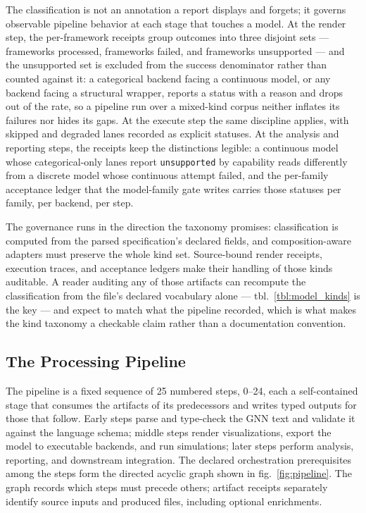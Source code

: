 \documentclass[
  english,
  9pt,
]{extarticle}
\begin{document}
The classification is not an annotation a report displays and forgets;
it governs observable pipeline behavior at each stage that touches a
model. At the render step, the per-framework receipts group outcomes
into three disjoint sets --- frameworks processed, frameworks failed,
and frameworks unsupported --- and the unsupported set is excluded from
the success denominator rather than counted against it: a categorical
backend facing a continuous model, or any backend facing a structural
wrapper, reports a status with a reason and drops out of the rate, so a
pipeline run over a mixed-kind corpus neither inflates its failures nor
hides its gaps. At the execute step the same discipline applies, with
skipped and degraded lanes recorded as explicit statuses. At the
analysis and reporting steps, the receipts keep the distinctions
legible: a continuous model whose categorical-only lanes report
\texttt{unsupported} by capability reads differently from a discrete
model whose continuous attempt failed, and the per-family acceptance
ledger that the model-family gate writes carries those statuses per
family, per backend, per step.

The governance runs in the direction the taxonomy promises:
classification is computed from the parsed specification's declared
fields, and composition-aware adapters must preserve the whole kind set.
Source-bound render receipts, execution traces, and acceptance ledgers
make their handling of those kinds auditable. A reader auditing any of
those artifacts can recompute the classification from the file's
declared vocabulary alone --- tbl.~\ref{tbl:model_kinds} is the key ---
and expect to match what the pipeline recorded, which is what makes the
kind taxonomy a checkable claim rather than a documentation convention.

\subsection{The Processing Pipeline}\label{the-processing-pipeline}

The pipeline is a fixed sequence of 25 numbered steps, 0--24, each a
self-contained stage that consumes the artifacts of its predecessors and
writes typed outputs for those that follow. Early steps parse and
type-check the GNN text and validate it against the language schema;
middle steps render visualizations, export the model to executable
backends, and run simulations; later steps perform analysis, reporting,
and downstream integration. The declared orchestration prerequisites
among the steps form the directed acyclic graph shown in
fig.~\ref{fig:pipeline}. The graph records which steps must precede
others; artifact receipts separately identify source inputs and produced
files, including optional enrichments.
\end{document}
